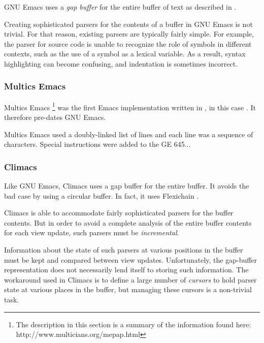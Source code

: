 GNU Emacs \cite{GNUEmacsLispReferenceManual}
\cite{CraftOfTextEditiing} uses a \emph{gap buffer} for the entire
buffer of text as described in .

Creating sophisticated parsers for the contents of a buffer in GNU
Emacs is not trivial.  For that reason, existing parsers are typically
fairly simple.  For example, the parser for \commonlisp{} source code
is unable to recognize the role of symbols in different contexts, such
as the use of a \commonlisp{} symbol as a lexical variable.  As a
result, syntax highlighting can become confusing, and indentation is
sometimes incorrect.

\subsubsection{Multics Emacs}

Multics Emacs%
\footnote{The description in this section is a summary of the
  information found here: http://www.multicians.org/mepap.html}
\cite{Greenberg:1980:MEC:800087.802784}
was the first Emacs implementation written in \lisp{}, in this case
\multics{} \maclisp{}.  It therefore pre-dates GNU Emacs.

Multics Emacs used a doubly-linked list of lines and each line was a
sequence of characters.  Special instructions were added to the GE
645...

\subsubsection{Climacs}

Like GNU Emacs, Climacs uses a gap buffer for the entire buffer.  It
avoids the bad case by using a circular buffer.  In fact, it uses
Flexichain \cite{flexichain}.

Climacs is able to accommodate fairly sophisticated parsers for the
buffer contents.  But in order to avoid a complete analysis of the
entire buffer contents for each view update, such parsers must be
\emph{incremental}.

Information about the state of such parsers at various positions in
the buffer must be kept and compared between view updates.
Unfortunately, the gap-buffer representation does not necessarily lend
itself to storing such information.  The workaround used in Climacs is
to define a large number of \emph{cursors} to hold parser state at
various places in the buffer, but managing these cursors is a
non-trivial task.

